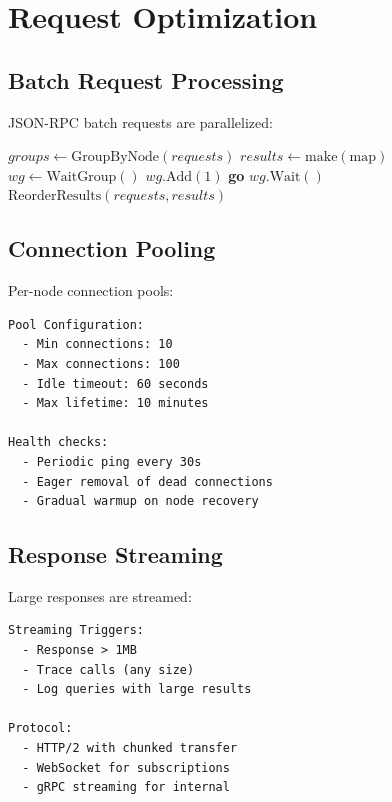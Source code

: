 \documentclass[11pt,a4paper]{article}
\begin{document}
\section{Request Optimization}

\subsection{Batch Request Processing}

JSON-RPC batch requests are parallelized:

\begin{algorithm}
\caption{Parallel Batch Processing}
\begin{algorithmic}[1]
    \State $groups \gets \text{GroupByNode}(requests)$
    \State $results \gets \text{make}(\text{map})$
    \State $wg \gets \text{WaitGroup}()$
        \State $wg.\text{Add}(1)$
        \State \textbf{go} 
    \EndFor
    \State $wg.\text{Wait}()$
    \Return $\text{ReorderResults}(requests, results)$
\EndProcedure
\end{algorithmic}
\end{algorithm}

\subsection{Connection Pooling}

Per-node connection pools:

\begin{lstlisting}
Pool Configuration:
  - Min connections: 10
  - Max connections: 100
  - Idle timeout: 60 seconds
  - Max lifetime: 10 minutes

Health checks:
  - Periodic ping every 30s
  - Eager removal of dead connections
  - Gradual warmup on node recovery
\end{lstlisting}

\subsection{Response Streaming}

Large responses are streamed:

\begin{lstlisting}
Streaming Triggers:
  - Response > 1MB
  - Trace calls (any size)
  - Log queries with large results

Protocol:
  - HTTP/2 with chunked transfer
  - WebSocket for subscriptions
  - gRPC streaming for internal
\end{lstlisting}
\end{document}
